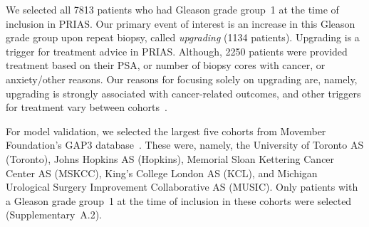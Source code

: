 We selected all 7813 patients who had Gleason grade group~1 at the time of inclusion in PRIAS. Our primary event of interest is an increase in this Gleason grade group upon repeat biopsy, called \textit{upgrading} (1134 patients). Upgrading is a trigger for treatment advice in PRIAS. Although, 2250 patients were provided treatment based on their PSA, or number of biopsy cores with cancer, or anxiety/other reasons. Our reasons for focusing solely on upgrading are, namely, upgrading is strongly associated with cancer-related outcomes, and other triggers for treatment vary between cohorts~\citep{nieboer2018active}.

For model validation, we selected the largest five cohorts from Movember Foundation's GAP3 database~\citep{gap3_2018}. These were, namely, the University of Toronto AS (Toronto), Johns Hopkins AS (Hopkins), Memorial Sloan Kettering Cancer Center AS (MSKCC), King's College London AS (KCL), and Michigan Urological Surgery Improvement Collaborative AS (MUSIC). Only patients with a Gleason grade group~1 at the time of inclusion in these cohorts were selected (Supplementary~A.2).